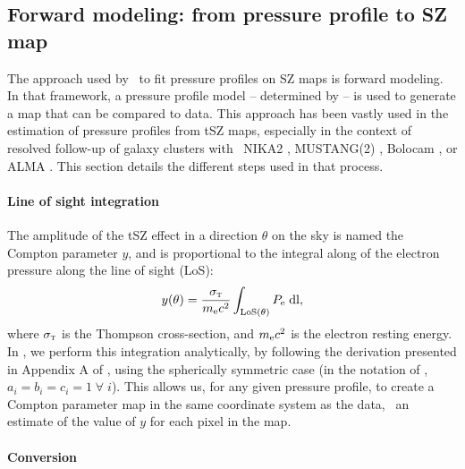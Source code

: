 \subsection{Forward modeling: from pressure profile to SZ map} \label{sec:algo:fwdmod}

The approach used by \panco\ to fit pressure profiles on SZ maps is forward modeling.
In that framework, a pressure profile model -- determined by  -- is used to generate a map that can be compared to data.
This approach has been vastly used in the estimation of pressure profiles from tSZ maps, especially in the context of resolved follow-up of galaxy clusters with \eg\ NIKA2 \citep[\eg][]{munoz-echeverria_multi-probe_2022,keruzore_exploiting_2020}, MUSTANG(2) \citep[\eg][]{romero_galaxy_2017,romero_pressure_2020}, Bolocam \citep[\eg][]{sayers_evolution_2022}, or ALMA \citep[\eg][]{di_mascolo_joint_2019}.
This section details the different steps used in that process.

\paragraph{Line of sight integration}

The amplitude of the tSZ effect in a direction $\theta$ on the sky is named the Compton parameter $y$, and is proportional to the integral along of the electron pressure along the line of sight (LoS):
\begin{equation}
    \label{eq:algo_ysz}
    y(\theta) = \frac{\sigma_\textsc{t}}{m_{\rm e}c^2} \int_{\rm LoS(\theta)} P_{\rm e} \; \dd l,
\end{equation}
where $\sigma_\textsc{t}$ is the Thompson cross-section, and $m_{\rm e} c^2$ is the electron resting energy. \\
In \panco, we perform this integration analytically, by following the derivation presented in Appendix A of \citet{romero_multi-instrument_2018}, using the spherically symmetric case (in the notation of \citeauthor{romero_multi-instrument_2018}, $a_i = b_i = c_i = 1 \; \forall \; i$).
This allows us, for any given pressure profile, to create a Compton parameter map in the same coordinate system as the data, \ie\ an estimate of the value of $y$ for each pixel in the map.

\paragraph{Conversion}

